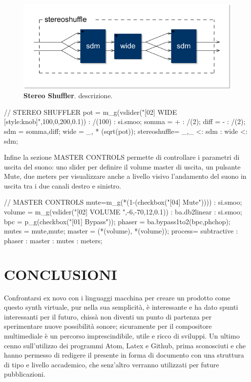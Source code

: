 \documentclass[
	a4paper,
	twocolumn
	]{article}
\begin{document}
\begin{figure}[b]%
\begin{center}
\includegraphics[width=.47\textwidth]{img/mid-side-shuffler.pdf}
\caption{\textbf{Stereo Shuffler}. descrizione.}
\label{shuff}
\end{center}
\end{figure}

// STEREO SHUFFLER
pot = m_g(vslider("[02] WIDE [style:knob]",100,0,200,0.1)) : /(100) : si.smoo;
somma = + : /(2);
diff = - : /(2);
sdm = somma,diff;
wide = _, * (sqrt(pot));
stereoshuffle= _,_ <: sdm : wide <: sdm;

Infine la sezione MASTER CONTROLS permette di controllare i parametri di uscita
del suono: uno slider per definire il volume master di uscita, un pulsante Mute,
due meters per visualizzare anche a livello visivo l'andamento del suono in
uscita tra i due canali destro e sinistro.

// MASTER CONTROLS
mute=m_g(*(1-(checkbox("[04] Mute")))) : si.smoo;
volume = m_g(vslider("[02] VOLUME ",-6,-70,12,0.1)) : ba.db2linear : si.smoo;
bpc = p_g(checkbox("[01] Bypass"));
phaser = ba.bypass1to2(bpc,phchop);
mutes = mute,mute;
master = (*(volume), *(volume));
process= subtractive : phaser : master : mutes : meters;


\section*{CONCLUSIONI}

Confrontarsi ex novo con i linguaggi macchina per creare un prodotto come questo
synth virtuale, pur nella sua semplicità, è interessante e ha dato spunti
interessanti per il futuro, chissà non diventi un punto di partenza per
sperimentare nuove possibilità sonore; sicuramente per il compositore
multimediale è un percorso imprescindibile, utile e ricco di sviluppi.
Un ultimo cenno sull'utilizzo dei programmi Atom, Latex e Github, prima
sconosciuti e che hanno permesso di redigere il presente in forma di
documento con una struttura di tipo e livello accademico, che senz'altro
verranno utilizzati per future pubblicazioni.
\end{document}
